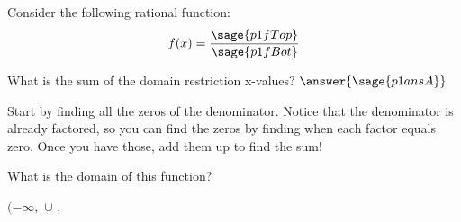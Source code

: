 \documentclass{ximera}
\begin{document}
\begin{problem}
    Consider the following rational function:
    \[
        f(x) = \frac{\sage{p1fTop}}{\sage{p1fBot}}
    \]
    
    What is the sum of the domain restriction x-values? $\answer{\sage{p1ansA}}$
    \begin{feedback}
        Start by finding all the zeros of the denominator. Notice that the denominator is already factored, so you can find the zeros by finding when each factor equals zero. Once you have those, add them up to find the sum!
    \end{feedback}
    
    \begin{problem}
        What is the domain of this function?
        
        $(-\infty,$
            \wordChoice{
                \choice{$($}
                \choice{$[$}
                \choice{$]$}
                \choice[correct]{$)$}
                }
                $\cup$
            \wordChoice{
                \choice[correct]{$($}
                \choice{$[$}
                \choice{$]$}
                \choice{$)$}
                }
            ,
\end{problem}
\end{problem}
\end{document}
